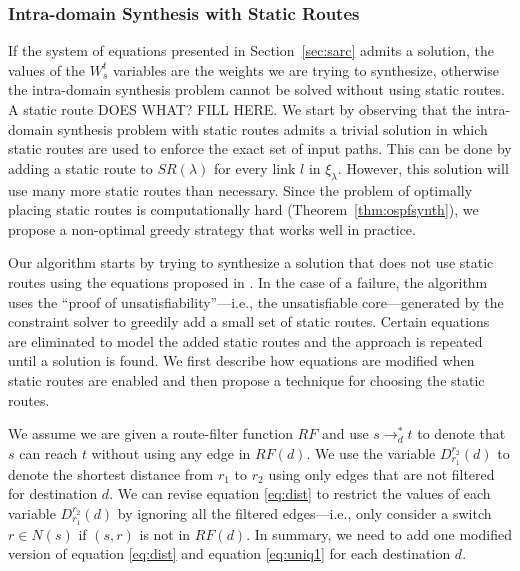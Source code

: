 \subsubsection{Intra-domain Synthesis with Static Routes} \label{sec:routefilter}

If the system of equations presented in Section~\ref{sec:sarc} admits a solution, 
the values of the $W_s^t$ variables are the weights we are trying to synthesize,
otherwise the intra-domain synthesis problem cannot be solved without using static 
routes.
A static route DOES WHAT? FILL HERE. 
We start by observing that the intra-domain synthesis problem with static routes
admits a trivial solution in which 
static routes are used to enforce the exact set of input paths. 
This can be done by adding a 
static route to $SR(\lambda)$ for every link $l$ in $\xi_\lambda$. 
However, this solution will use many more static routes than necessary.
Since the problem of optimally placing static routes is computationally hard (Theorem~\ref{thm:ospfsynth}), 
we propose a non-optimal greedy strategy that works well in practice.

Our algorithm starts by trying to synthesize a solution
that does not use static routes using the equations proposed in . 
In the case of a failure, the algorithm uses the ``proof of unsatisfiability''---i.e., the unsatisfiable core---generated by 
the constraint solver 
to greedily add a small set of static routes. 
Certain equations are eliminated 
to model the added static routes 
and the approach is repeated until a solution is found.
We first describe how  
equations are modified when
static routes are enabled and then propose a
technique for choosing the static routes. 

We assume we are given a route-filter function $RF$ and 
use $s\rightarrow_d^* t$ to denote that $s$ can reach $t$
without using any edge in $RF(d)$.
We use the variable $D_{r_1}^{r_2}(d)$ to denote the shortest distance from $r_1$ to $r_2$
using only edges that are not filtered for destination $d$.
We can revise equation \eqref{eq:dist}   to restrict the values of 
each variable $D_{r_1}^{r_2}(d)$
by  ignoring all the filtered edges---i.e., only consider a switch $r\in N(s)$ if
$(s,r)$ is not in $RF(d)$. 
In summary, we need to add one modified version of equation \eqref{eq:dist} 
and equation  \eqref{eq:uniq1} for each destination $d$.

